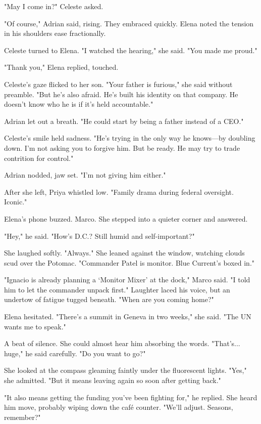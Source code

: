 "May I come in?" Celeste asked.

"Of course," Adrian said, rising. They embraced quickly. Elena noted the tension in his shoulders ease fractionally.

Celeste turned to Elena. "I watched the hearing," she said. "You made me proud."

"Thank you," Elena replied, touched.

Celeste's gaze flicked to her son. "Your father is furious," she said without preamble. "But he's also afraid. He's built his identity on that company. He doesn't know who he is if it's held accountable."

Adrian let out a breath. "He could start by being a father instead of a CEO."

Celeste's smile held sadness. "He's trying in the only way he knows—by doubling down. I'm not asking you to forgive him. But be ready. He may try to trade contrition for control."

Adrian nodded, jaw set. "I'm not giving him either."

After she left, Priya whistled low. "Family drama during federal oversight. Iconic."

Elena's phone buzzed. Marco. She stepped into a quieter corner and answered.

"Hey," he said. "How's D.C.? Still humid and self-important?"

She laughed softly. "Always." She leaned against the window, watching clouds scud over the Potomac. "Commander Patel is monitor. Blue Current's boxed in."

"Ignacio is already planning a `Monitor Mixer' at the dock," Marco said. "I told him to let the commander unpack first." Laughter laced his voice, but an undertow of fatigue tugged beneath. "When are you coming home?"

Elena hesitated. "There's a summit in Geneva in two weeks," she said. "The UN wants me to speak."

A beat of silence. She could almost hear him absorbing the words. "That's... huge," he said carefully. "Do you want to go?"

She looked at the compass gleaming faintly under the fluorescent lights. "Yes," she admitted. "But it means leaving again so soon after getting back."

"It also means getting the funding you've been fighting for," he replied. She heard him move, probably wiping down the café counter. "We'll adjust. Seasons, remember?"

